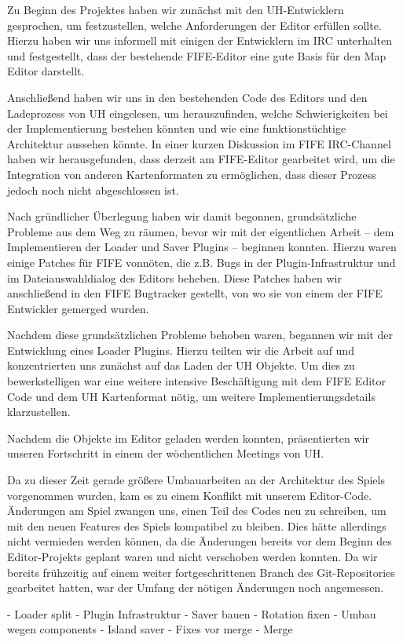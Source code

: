 Zu Beginn des Projektes haben wir zunächst mit den UH-Entwicklern gesprochen,
um festzustellen, welche Anforderungen der Editor erfüllen sollte. Hierzu
haben wir uns informell mit einigen der Entwicklern im IRC unterhalten und
festgestellt, dass der bestehende FIFE-Editor eine gute Basis für den Map
Editor darstellt.

Anschließend haben wir uns in den bestehenden Code des Editors und den Ladeprozess
von UH eingelesen, um herauszufinden, welche Schwierigkeiten bei der Implementierung
bestehen könnten und wie eine funktionstüchtige Architektur aussehen könnte.
In einer kurzen Diskussion im FIFE IRC-Channel haben wir herausgefunden, dass
derzeit am FIFE-Editor gearbeitet wird, um die Integration von anderen Kartenformaten
zu ermöglichen, dass dieser Prozess jedoch noch nicht abgeschlossen ist.

Nach gründlicher Überlegung haben wir damit begonnen, grundsätzliche Probleme aus
dem Weg zu räumen, bevor wir mit der eigentlichen Arbeit -- dem Implementieren
der Loader und Saver Plugins -- beginnen konnten. Hierzu waren einige Patches für
FIFE vonnöten, die z.B. Bugs in der Plugin-Infrastruktur und im Dateiauswahldialog
des Editors beheben. Diese Patches haben wir anschließend in den FIFE Bugtracker
gestellt, von wo sie von einem der FIFE Entwickler gemerged wurden.

Nachdem diese grundsätzlichen Probleme behoben waren, begannen wir mit der Entwicklung
eines Loader Plugins. Hierzu teilten wir die Arbeit auf und konzentrierten uns zunächst
auf das Laden der UH Objekte. Um dies zu bewerkstelligen war eine weitere intensive Beschäftigung
mit dem FIFE Editor Code und dem UH Kartenformat nötig, um weitere Implementierungsdetails
klarzustellen.

Nachdem die Objekte im Editor geladen werden konnten, präsentierten wir unseren Fortschritt
in einem der wöchentlichen Meetings von UH.

Da zu dieser Zeit gerade größere Umbauarbeiten an der Architektur des Spiels vorgenommen wurden,
kam es zu einem Konflikt mit unserem Editor-Code. Änderungen am Spiel zwangen uns, einen Teil
des Codes neu zu schreiben, um mit den neuen Features des Spiels kompatibel zu bleiben. Dies
hätte allerdings nicht vermieden werden können, da die Änderungen bereits vor dem Beginn des
Editor-Projekts geplant waren und nicht verschoben werden konnten. Da wir bereits frühzeitig
auf einem weiter fortgeschrittenen Branch des Git-Repositories gearbeitet hatten, war der
Umfang der nötigen Änderungen noch angemessen.

- Loader split
- Plugin Infrastruktur
- Saver bauen
- Rotation fixen
- Umbau wegen components
- Island saver
- Fixes vor merge
- Merge
